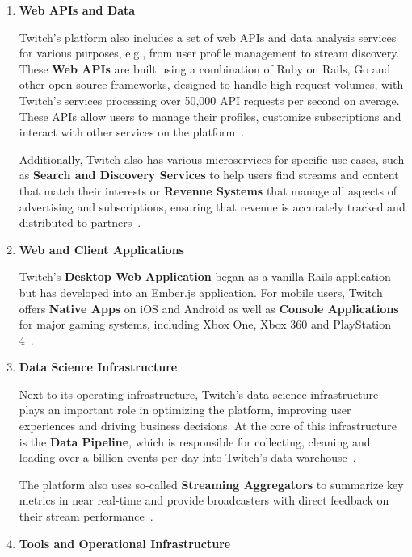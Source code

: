 \begin{enumerate}
    \item \textbf{Web \ac{API}s and Data}

    Twitch’s platform also includes a set of web \ac{API}s and data analysis services for various purposes, e.g., from user profile management to stream discovery. These \textbf{Web \ac{API}s} are built using a combination of Ruby on Rails, Go and other open-source frameworks, designed to handle high request volumes, with Twitch's services processing over 50,000 \ac{API} requests per second on average. These \ac{API}s allow users to manage their profiles, customize subscriptions and interact with other services on the platform~\parencite{twitch_engineering}.

    Additionally, Twitch also has various microservices for specific use cases, such as \textbf{Search and Discovery Services} to help users find streams and content that match their interests or \textbf{Revenue Systems} that manage all aspects of advertising and subscriptions, ensuring that revenue is accurately tracked and distributed to partners~\parencite{twitch_engineering}. 
    
    \break \item \textbf{Web and Client Applications}
    
    Twitch’s \textbf{Desktop Web Application} began as a vanilla Rails application but has developed into an Ember.js application. For mobile users, Twitch offers \textbf{Native Apps} on iOS and Android as well as \textbf{Console Applications} for major gaming systems, including Xbox One, Xbox 360 and PlayStation 4~\parencite{twitch_engineering}.

    \item \textbf{Data Science Infrastructure}

    Next to its operating infrastructure, Twitch’s data science infrastructure plays an important role in optimizing the platform, improving user experiences and driving business decisions. At the core of this infrastructure is the \textbf{Data Pipeline}, which is responsible for collecting, cleaning and loading over a billion events per day into Twitch’s data warehouse~\parencite{twitch_engineering}. 

    The platform also uses so-called \textbf{Streaming Aggregators} to summarize key metrics in near real-time and provide broadcasters with direct feedback on their stream performance~\parencite{twitch_engineering}.

    \item \textbf{Tools and Operational Infrastructure}


\end{enumerate}
